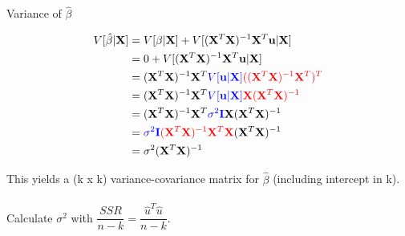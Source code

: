 \documentclass[11pt]{beamer}
\begin{document}
 
 \begin{frame}{Variance of $\hat{\beta}$}
 
\begin{align*}
V[\hat{\beta}|\mathbf{X}] &= V[\beta|\mathbf{X}] + V[ (\mathbf{X}^{T}\mathbf{X})^{-1}\mathbf{X}^{T}\mathbf{u}|\mathbf{X}]\\
 &= 0 + V[ (\mathbf{X}^{T}\mathbf{X})^{-1}\mathbf{X}^{T}\mathbf{u}|\mathbf{X}]\\
&= (\mathbf{X}^{T}\mathbf{X})^{-1}\mathbf{X}^{T} \textcolor{blue}{V[\mathbf{u}|\mathbf{X}]} \textcolor{red}{( (\mathbf{X}^{T}\mathbf{X})^{-1}\mathbf{X}^{T})^{T}}\\
& = (\mathbf{X}^{T}\mathbf{X})^{-1}\mathbf{X}^{T} \textcolor{blue}{V[\mathbf{u}|\mathbf{X}]}\textcolor{red}{\mathbf{X}(\mathbf{X}^{T}\mathbf{X})^{-1}}\\
& = (\mathbf{X}^{T}\mathbf{X})^{-1}\mathbf{X}^{T} \textcolor{blue}{\sigma^{2}\mathbf{I}}\mathbf{X}(\mathbf{X}^{T}\mathbf{X})^{-1}\\
& = \textcolor{blue}{\sigma^{2}\mathbf{I}} \textcolor{red}{(\mathbf{X}^{T}\mathbf{X})^{-1}\mathbf{X}^{T}\mathbf{X}}(\mathbf{X}^{T}\mathbf{X})^{-1}\\
& = \sigma^{2}(\mathbf{X}^{T}\mathbf{X})^{-1}
\end{align*}

This yields a (k x k) variance-covariance matrix for $\hat\beta$ (including intercept in k). \\~\\

Calculate $\sigma^{2}$ with $\dfrac{SSR}{n-k} = \dfrac{\hat{u}^{T}\hat{u}}{n-k}$.  

 \end{frame}
 
\end{document}
